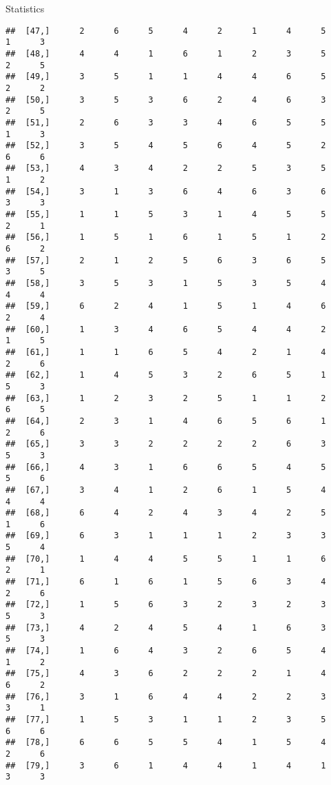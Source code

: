 \documentclass[
  ignorenonframetext,
]{beamer}
\begin{document}
\begin{frame}[fragile]{Statistics}
\begin{verbatim}
##  [47,]      2      6      5      4      2      1      4      5      1      3
##  [48,]      4      4      1      6      1      2      3      5      2      5
##  [49,]      3      5      1      1      4      4      6      5      2      2
##  [50,]      3      5      3      6      2      4      6      3      2      5
##  [51,]      2      6      3      3      4      6      5      5      1      3
##  [52,]      3      5      4      5      6      4      5      2      6      6
##  [53,]      4      3      4      2      2      5      3      5      1      2
##  [54,]      3      1      3      6      4      6      3      6      3      3
##  [55,]      1      1      5      3      1      4      5      5      2      1
##  [56,]      1      5      1      6      1      5      1      2      6      2
##  [57,]      2      1      2      5      6      3      6      5      3      5
##  [58,]      3      5      3      1      5      3      5      4      4      4
##  [59,]      6      2      4      1      5      1      4      6      2      4
##  [60,]      1      3      4      6      5      4      4      2      1      5
##  [61,]      1      1      6      5      4      2      1      4      2      6
##  [62,]      1      4      5      3      2      6      5      1      5      3
##  [63,]      1      2      3      2      5      1      1      2      6      5
##  [64,]      2      3      1      4      6      5      6      1      2      6
##  [65,]      3      3      2      2      2      2      6      3      5      3
##  [66,]      4      3      1      6      6      5      4      5      5      6
##  [67,]      3      4      1      2      6      1      5      4      4      4
##  [68,]      6      4      2      4      3      4      2      5      1      6
##  [69,]      6      3      1      1      1      2      3      3      5      4
##  [70,]      1      4      4      5      5      1      1      6      2      1
##  [71,]      6      1      6      1      5      6      3      4      2      6
##  [72,]      1      5      6      3      2      3      2      3      5      3
##  [73,]      4      2      4      5      4      1      6      3      5      3
##  [74,]      1      6      4      3      2      6      5      4      1      2
##  [75,]      4      3      6      2      2      2      1      4      6      2
##  [76,]      3      1      6      4      4      2      2      3      3      1
##  [77,]      1      5      3      1      1      2      3      5      6      6
##  [78,]      6      6      5      5      4      1      5      4      2      6
##  [79,]      3      6      1      4      4      1      4      1      3      3

\end{verbatim}
\end{frame}
\end{document}
